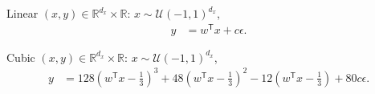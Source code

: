 \documentclass[11pt]{article}
\newcommand{\T}{^{\ensuremath{\mathsf{T}}}}           %
\providecommand{\mb}[1]{\boldsymbol{#1}}
\providecommand{\mc}[1]{\mathcal{#1}}
\newcommand{\Real}{\mathbb{R}}
\begin{document}

%
%
%
%
%
%
%
%

\setcounter{equation}{0}
\begin{compactenum}
\item Linear $(x,y) \in \Real^{d_{x}} \times \Real$: $x \sim \mc{U}(-1,1)^{d_{x}}$, 
\begin{align*}
y &=w\T x+c\epsilon.
\end{align*}
\item Cubic $(x,y) \in \Real^{d_{x}} \times \Real$: $x \sim \mc{U}(-1,1)^{d_{x}}$, 
\begin{align*}
y &=128(w\T x-\tfrac{1}{3})^3+48(w\T x-\tfrac{1}{3})^2-12(w\T x-\tfrac{1}{3})+80c\epsilon.
\end{align*}
%
%
%
%
%
%
%
%
%
%
%
%
%
%

\end{compactenum}
\end{document}
